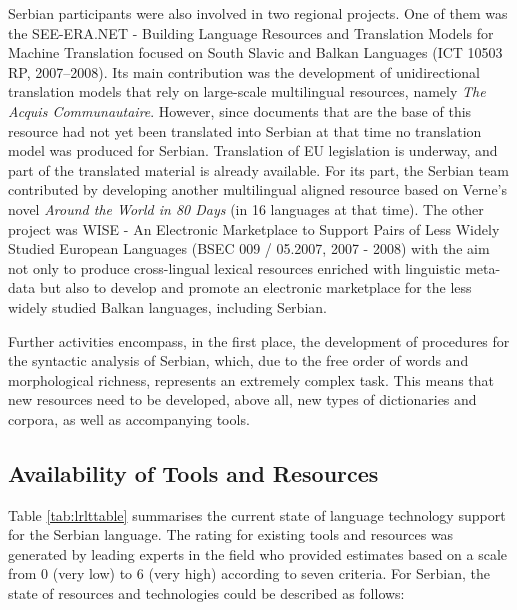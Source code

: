 {\begin{multicols}{2}

Serbian participants were also involved in two regional projects. One of them was the SEE-ERA.NET - Building Language Resources and Translation Models for Machine Translation focused on South Slavic and Balkan Languages (ICT 10503 RP, 2007--2008). Its main contribution was the development of unidirectional translation models that rely on large-scale multilingual resources, namely \textit{The Acquis Communautaire}. However, since documents that are the base of this resource had not yet been translated into Serbian at that time no translation model was produced for Serbian. Translation of EU legislation is underway, and part of the translated material is already available. \cite{PREVODJENJE} For its part, the Serbian team contributed by developing another multilingual aligned resource based on Verne’s novel \textit{Around the World in 80 Days} (in 16 languages at that time).  The other project was WISE - An Electronic Marketplace to Support Pairs of Less Widely Studied European Languages (BSEC 009 / 05.2007, 2007 - 2008) with the aim not only to produce cross-lingual lexical resources enriched with linguistic meta-data but also to develop and promote an electronic marketplace for the less widely studied Balkan languages, including Serbian.

Further activities encompass, in the first place, the development of procedures for the syntactic analysis of Serbian, which, due to the free order of words and morphological richness, represents an extremely complex task. This means that new resources need to be developed, above all, new types of dictionaries and corpora, as well as accompanying tools.  


 \subsection {Availability of Tools and Resources}
   
 
Table \ref{tab:lrlttable} summarises the current state of language technology support for the Serbian language. The rating for existing tools and resources was generated by leading experts in the field who provided estimates based on a scale from 0 (very low) to 6 (very high) according to seven criteria.
For Serbian, the state of resources and technologies could be described as follows:


\end{multicols}}
